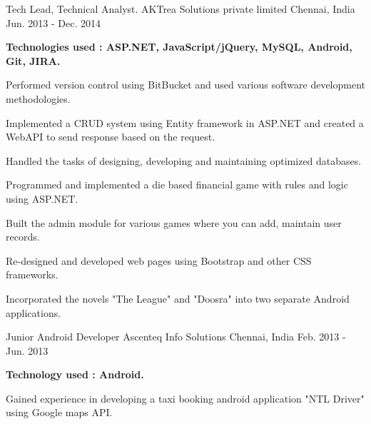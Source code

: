 \begin{cventries}
  \cventry
    {Tech Lead, Technical Analyst.}
    {AKTrea Solutions private limited}
    {Chennai, India}
    {Jun. 2013 - Dec. 2014}
    {
      \begin{cvitems}
        \item[] {\textbf {Technologies used : ASP.NET, JavaScript/jQuery, MySQL, Android, Git, JIRA.} }
        \item {Performed version control using BitBucket and used various software development methodologies. }
        \item {Implemented a CRUD system using Entity framework in ASP.NET and created a WebAPI to send response based on the request. }
        \item {Handled the tasks of designing, developing and maintaining optimized databases.}
        \item {Programmed and implemented a die based financial game with rules and logic using ASP.NET.}
        \item {Built the admin module for various games where you can add, maintain user records.}
        \item {Re-designed and developed web pages using Bootstrap and other CSS frameworks.}
        \item {Incorporated the novels "The League" and "Doosra" into two separate Android applications.}
      \end{cvitems}
    }
 
 
    \cventry
    {Junior Android Developer}
    {Ascenteq Info Solutions}
    {Chennai, India}
    {Feb. 2013 - Jun. 2013}
    {
        \begin{cvitems}
\item[]{\textbf {Technology used : Android.}}
            \item {Gained experience in developing a taxi booking android application "NTL Driver" using Google maps API.}
        \end{cvitems}
    }
    

\end{cventries}
